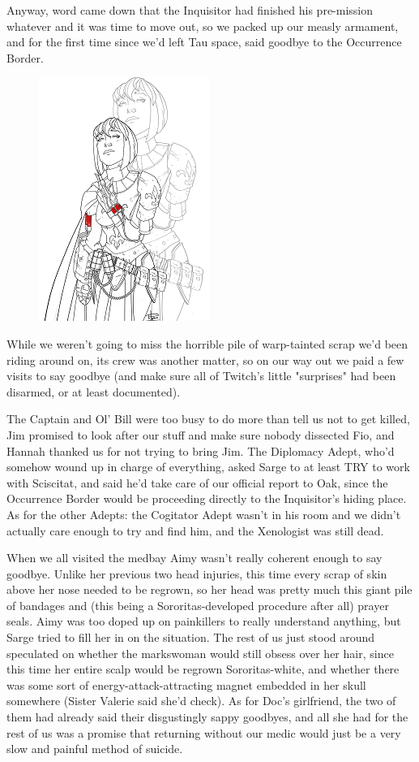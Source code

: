 Anyway, word came down that the Inquisitor had finished his pre-mission whatever and it was time to move out, so we packed up our measly armament, and for the first time since we'd left Tau space, said goodbye to the Occurrence Border. 


\begin{figure}
	\begin{center}
		\includegraphics[width=\figwidth]{pics/17/18.png}
	\end{center}
\end{figure}
While we weren't going to miss the horrible pile of warp-tainted scrap we'd been riding around on, its crew was another matter, so on our way out we paid a few visits to say goodbye (and make sure all of Twitch's little "surprises" had been disarmed, or at least documented). 


The Captain and Ol' Bill were too busy to do more than tell us not to get killed, Jim promised to look after our stuff and make sure nobody dissected Fio, and Hannah thanked us for not trying to bring Jim. 
The Diplomacy Adept, who'd somehow wound up in charge of everything, asked Sarge to at least TRY to work with Sciscitat, and said he'd take care of our official report to Oak, since the Occurrence Border would be proceeding directly to the Inquisitor's hiding place. 
As for the other Adepts: 
the Cogitator Adept wasn't in his room and we didn't actually care enough to try and find him, and the Xenologist was still dead.

When we all visited the medbay Aimy wasn't really coherent enough to say goodbye. 
Unlike her previous two head injuries, this time every scrap of skin above her nose needed to be regrown, so her head was pretty much this giant pile of bandages and (this being a Sororitas-developed procedure after all) prayer seals. 
Aimy was too doped up on painkillers to really understand anything, but Sarge tried to fill her in on the situation. 
The rest of us just stood around speculated on whether the markswoman would still obsess over her hair, since this time her entire scalp would be regrown Sororitas-white, and whether there was some sort of energy-attack-attracting magnet embedded in her skull somewhere (Sister Valerie said she'd check). 
As for Doc's girlfriend, the two of them had already said their disgustingly sappy goodbyes, and all she had for the rest of us was a promise that returning without our medic would just be a very slow and painful method of suicide.


